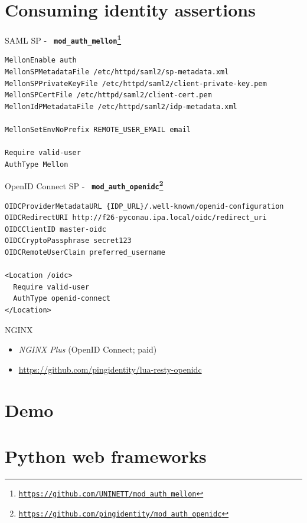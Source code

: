 \documentclass[ignorenonframetext,aspectratio=169]{beamer}
\providecommand{\tightlist}{%
  \setlength{\itemsep}{0pt}\setlength{\parskip}{0pt}}
\begin{document}
\section{Consuming identity assertions}

\begin{frame}[fragile]{SAML SP - \bf \tt
    mod\_auth\_mellon\footnote{\url{https://github.com/UNINETT/mod_auth_mellon}}}

\begin{verbatim}
MellonEnable auth
MellonSPMetadataFile /etc/httpd/saml2/sp-metadata.xml
MellonSPPrivateKeyFile /etc/httpd/saml2/client-private-key.pem
MellonSPCertFile /etc/httpd/saml2/client-cert.pem
MellonIdPMetadataFile /etc/httpd/saml2/idp-metadata.xml

MellonSetEnvNoPrefix REMOTE_USER_EMAIL email

Require valid-user
AuthType Mellon
\end{verbatim}

\end{frame}

\begin{frame}[fragile]{OpenID Connect SP - \bf \tt
    mod\_auth\_openidc\footnote{\url{https://github.com/pingidentity/mod_auth_openidc}}}

\begin{verbatim}
OIDCProviderMetadataURL {IDP_URL}/.well-known/openid-configuration
OIDCRedirectURI http://f26-pyconau.ipa.local/oidc/redirect_uri
OIDCClientID master-oidc
OIDCCryptoPassphrase secret123
OIDCRemoteUserClaim preferred_username

<Location /oidc>
  Require valid-user
  AuthType openid-connect
</Location>
\end{verbatim}

\end{frame}

\begin{frame}[fragile]{NGINX}
\begin{itemize}
\tightlist
\item {\em NGINX Plus} (OpenID Connect; paid)
\item \url{https://github.com/pingidentity/lua-resty-openidc}
\end{itemize}
\end{frame}

\section{Demo}

\section{Python web frameworks}
\end{document}

